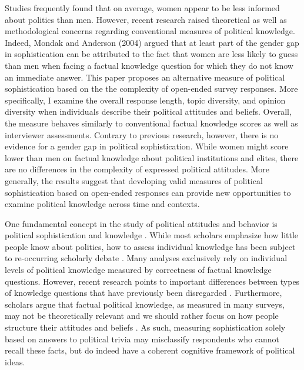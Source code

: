 \documentclass[12pt]{article}
\begin{document}
Studies frequently found that on average, women appear to be less informed about politics than men. However, recent research raised theoretical as well as methodological concerns regarding conventional measures of political knowledge. Indeed, Mondak and Anderson (2004) argued that at least part of the gender gap in sophistication can be attributed to the fact that women are less likely to guess than men when facing a factual knowledge question for which they do not know an immediate answer. This paper proposes an alternative measure of political sophistication based on the the complexity of open-ended survey responses. More specifically, I examine the overall response length, topic diversity, and opinion diversity when individuals describe their political attitudes and beliefs. Overall, the measure behaves similarly to conventional factual knowledge scores as well as interviewer assessments. Contrary to previous research, however, there is no evidence for a gender gap in political sophistication. While women might score lower than men on factual knowledge about political institutions and elites, there are no differences in the complexity of expressed political attitudes. More generally, the results suggest that developing valid measures of political sophistication based on open-ended responses can provide new opportunities to examine political knowledge across time and contexts. 

One fundamental concept in the study of political attitudes and behavior is political sophistication and knowledge \citep{converse1964nature,carpini1996americans}. While most scholars emphasize how little people know about politics, how to assess individual knowledge has been subject to re-occurring scholarly debate \citep[e.g.][]{mondak2000reconsidering,mondak2001asked,sturgis2008experiment,debell2013harder,pietryka2013analysis}. Many analyses exclusively rely on individual levels of political knowledge measured by correctness of factual knowledge questions. However, recent research points to important differences between types of knowledge questions that have previously been disregarded \citep{barabas2014question}. Furthermore, scholars argue that factual political knowledge, as measured in many surveys, may not be theoretically relevant \citep{lupia2006elitism} and we should rather focus on how people structure their attitudes and beliefs \citep[e.g.][]{luskin1987measuring}. As such, measuring sophistication solely based on answers to political trivia may misclassify respondents who cannot recall these facts, but do indeed have a coherent cognitive framework of political ideas.
\end{document}

